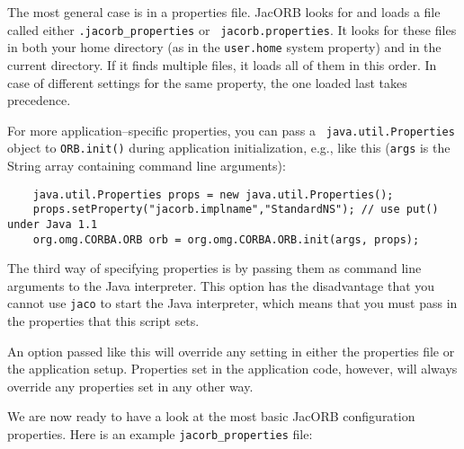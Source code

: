\documentclass[12pt]{scrbook}
\begin{document}
The most  general case is in  a properties file. JacORB  looks for and
loads  a   file  called  either  {\tt   .jacorb\_properties}  or  {\tt
jacorb.properties}.   It  looks for  these  files  in  both your  home
directory  (as in  the {\tt  user.home}  system property)  and in  the
current directory.  If  it finds multiple files, it  loads all of them
in this  order. In case of  different settings for  the same property,
the one loaded last takes precedence.

For  more  application--specific  properties,  you  can  pass  a  {\tt
java.util.Properties}  object to  {\tt ORB.init()}  during application
initialization,  e.g.,  like this  ({\tt  args}  is  the String  array
containing command line arguments):

\small{
\begin{verbatim}            
    java.util.Properties props = new java.util.Properties();
    props.setProperty("jacorb.implname","StandardNS"); // use put() under Java 1.1
    org.omg.CORBA.ORB orb = org.omg.CORBA.ORB.init(args, props);
\end{verbatim}
}

The third way  of specifying properties is by  passing them as command
line  arguments   to  the  Java  interpreter.  This   option  has  the
disadvantage  that  you cannot  use  {\tt  jaco}  to start  the  Java
interpreter, which  means that  you must pass  in the  properties that
this script sets.


An option  passed like  this will override  any setting in  either the
properties  file  or the  application  setup.  Properties  set in  the
application code, however, will  always override any properties set in
any other way.

We are now ready to have a look at the most basic JacORB configuration
properties.  Here is an example {\tt jacorb\_properties} file: 
\end{document}
